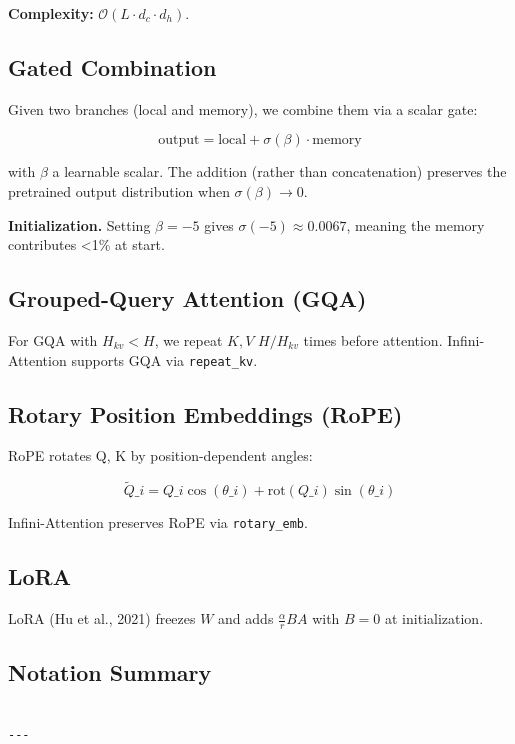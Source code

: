 \textbf{Complexity:} $\mathcal{O}(L \cdot d_c \cdot d_h)$.

\subsection{Gated Combination}

Given two branches (local and memory), we combine them via a scalar gate:

\[
\text{output} = \text{local} + \sigma(\beta) \cdot \text{memory}
\tag{3.5}
\]

with $\beta$ a learnable scalar. The addition (rather than concatenation) 
preserves the pretrained output distribution when $\sigma(\beta) \to 0$.

\textbf{Initialization.} Setting $\beta = -5$ gives $\sigma(-5) \approx 0.0067$, 
meaning the memory contributes \textless{}1\% at start.

\subsection{Grouped-Query Attention (GQA)}

For GQA with $H_{kv} < H$, we repeat $K, V$ $H / H_{kv}$ times before 
attention. Infini-Attention supports GQA via \texttt{repeat\_kv}.

\subsection{Rotary Position Embeddings (RoPE)}

RoPE rotates Q, K by position-dependent angles:

\[
\tilde{Q}\_i = Q\_i \cos(\theta\_i) + \text{rot}(Q\_i) \sin(\theta\_i)
\tag{3.6}
\]

Infini-Attention preserves RoPE via \texttt{rotary\_emb}.

\subsection{LoRA}

LoRA (Hu et al., 2021) freezes $W$ and adds $\frac{\alpha}{r} B A$ with 
$B = 0$ at initialization.

\subsection{Notation Summary}

\begin{lstlisting}

---
\end{lstlisting}
